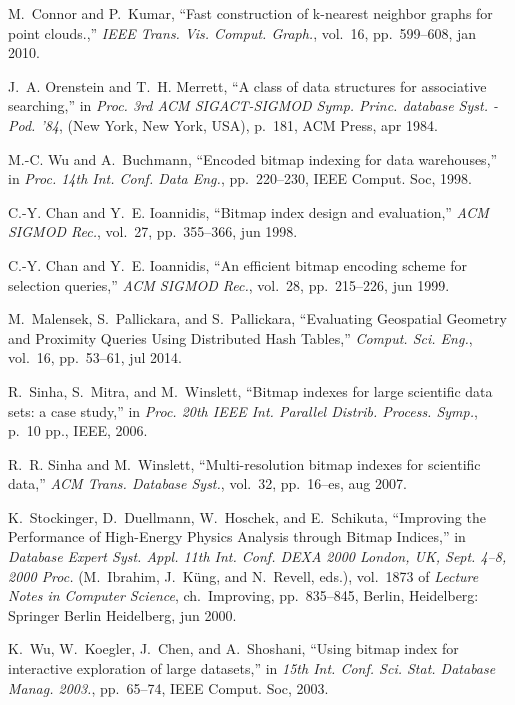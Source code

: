 \begin{thebibliography}{10}
M.~Connor and P.~Kumar, ``{Fast construction of k-nearest neighbor graphs for
  point clouds.},'' {\em IEEE Trans. Vis. Comput. Graph.}, vol.~16,
  pp.~599--608, jan 2010.

J.~A. Orenstein and T.~H. Merrett, ``{A class of data structures for
  associative searching},'' in {\em Proc. 3rd ACM SIGACT-SIGMOD Symp. Princ.
  database Syst. - Pod. '84}, (New York, New York, USA), p.~181, ACM Press, apr
  1984.

M.-C. Wu and A.~Buchmann, ``{Encoded bitmap indexing for data warehouses},'' in
  {\em Proc. 14th Int. Conf. Data Eng.}, pp.~220--230, IEEE Comput. Soc, 1998.

C.-Y. Chan and Y.~E. Ioannidis, ``{Bitmap index design and evaluation},'' {\em
  ACM SIGMOD Rec.}, vol.~27, pp.~355--366, jun 1998.

C.-Y. Chan and Y.~E. Ioannidis, ``{An efficient bitmap encoding scheme for
  selection queries},'' {\em ACM SIGMOD Rec.}, vol.~28, pp.~215--226, jun 1999.

M.~Malensek, S.~Pallickara, and S.~Pallickara, ``{Evaluating Geospatial
  Geometry and Proximity Queries Using Distributed Hash Tables},'' {\em Comput.
  Sci. Eng.}, vol.~16, pp.~53--61, jul 2014.

R.~Sinha, S.~Mitra, and M.~Winslett, ``{Bitmap indexes for large scientific
  data sets: a case study},'' in {\em Proc. 20th IEEE Int. Parallel Distrib.
  Process. Symp.}, p.~10 pp., IEEE, 2006.

R.~R. Sinha and M.~Winslett, ``{Multi-resolution bitmap indexes for scientific
  data},'' {\em ACM Trans. Database Syst.}, vol.~32, pp.~16--es, aug 2007.

K.~Stockinger, D.~Duellmann, W.~Hoschek, and E.~Schikuta, ``{Improving the
  Performance of High-Energy Physics Analysis through Bitmap Indices},'' in
  {\em Database Expert Syst. Appl. 11th Int. Conf. DEXA 2000 London, UK, Sept.
  4--8, 2000 Proc.} (M.~Ibrahim, J.~K{\"{u}}ng, and N.~Revell, eds.), vol.~1873
  of {\em Lecture Notes in Computer Science}, ch.~Improving, pp.~835--845,
  Berlin, Heidelberg: Springer Berlin Heidelberg, jun 2000.

K.~Wu, W.~Koegler, J.~Chen, and A.~Shoshani, ``{Using bitmap index for
  interactive exploration of large datasets},'' in {\em 15th Int. Conf. Sci.
  Stat. Database Manag. 2003.}, pp.~65--74, IEEE Comput. Soc, 2003.


\end{thebibliography}
